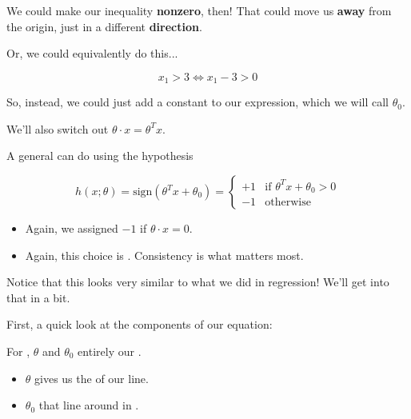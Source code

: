         We could make our inequality \textbf{nonzero}, then! That could move us \textbf{away} from the origin, just in a different \textbf{direction}.
        
        Or, we could equivalently do this...
        
        \begin{equation}
            x_1 >3 \Longleftrightarrow x_1-3 > 0
        \end{equation}
        
        So, instead, we could just add a constant to our expression, which we will call $\theta_0$.
        
        We'll also switch out $\theta \cdot x = \theta^T x$.\\
        
        \begin{kequation}
            A general  can do  using the hypothesis
            
            \begin{equation*}
                h(x; \theta) = \text{sign}(\theta^T x + \theta_0 )= 
                \begin{cases}
                    +1 & \text{if $\theta^T x + \theta_0 > 0$} \\
                    -1 & \text{otherwise}
                \end{cases}
            \end{equation*}

            \subsecdiv

            \begin{itemize}
                \item Again, we assigned $-1$ if $\theta \cdot x=0$.
                \item Again, this choice is . Consistency is what matters most.
            \end{itemize}
        \end{kequation}
        
        Notice that this looks very similar to what we did in regression! We'll get into that in a bit.
        
        First, a quick look at the components of our equation:\\
        
        \begin{concept}
            For , $\theta$ and $\theta_0$ entirely  our .
            
            \begin{itemize}
                \item $\theta$ gives us the  of our line.
                \item $\theta_0$  that line around in .
            \end{itemize}
        \end{concept}
    
